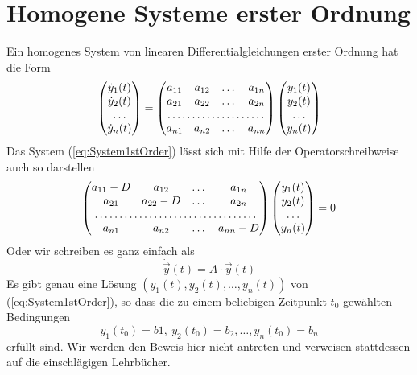 \section{Homogene Systeme erster Ordnung}
Ein homogenes System von linearen Differentialgleichungen erster Ordnung hat
die Form
\begin{equation}
  \begin{pmatrix}
    \dot{y}_1(t)\\
    \dot{y}_2(t)\\
    \dots\\
    \dot{y}_n(t)
  \end{pmatrix}
  =
  \begin{pmatrix}
    a_{11}&a_{12}&\dots &a_{1n}\\
    a_{21}&a_{22}&\dots &a_{2n}\\
    \multicolumn{4}{c}\dotfill\\
    a_{n1}&a_{n2}&\dots &a_{nn}\\
  \end{pmatrix}
  \begin{pmatrix}
    y_1(t)\\
    y_2(t)\\
    \dots\\
    y_n(t)
  \end{pmatrix}
  \label{eq:System1stOrder}
\end{equation}
Das System (\ref{eq:System1stOrder}) lässt sich mit Hilfe der
Operatorschreibweise auch so darstellen
\begin{equation}
  \begin{pmatrix}
    a_{11}-D&a_{12}&\dots &a_{1n}\\
    a_{21}&a_{22}-D&\dots &a_{2n}\\
    \multicolumn{4}{c}\dotfill\\
    a_{n1}&a_{n2}&\dots &a_{nn}-D\\
  \end{pmatrix}
  \begin{pmatrix}
    y_1(t)\\
    y_2(t)\\
    \dots\\
    y_n(t)
  \end{pmatrix}
  =0
  \label{eq:System1stOperator}
\end{equation}
Oder wir schreiben es ganz einfach als
\begin{equation}
  \dot{\vec{y}}(t)=A\cdot\vec{y}(t)
  \label{eq:SystemVectorMatrixNotation}
\end{equation}
Es gibt genau eine Lösung $(y_1(t),y_2(t),\dots,y_n(t))$ von
(\ref{eq:System1stOrder}), so dass die zu einem beliebigen Zeitpunkt $t_0$
gewählten Bedingungen
\begin{equation}
  y_1(t_0)=b1,\:y_2(t_0)=b_2,\dots,y_n(t_0)=b_n
  \label{eq:ICsSystem}
\end{equation}
erfüllt sind. Wir werden den Beweis hier nicht antreten und verweisen
stattdessen auf die einschlägigen Lehrbücher.

